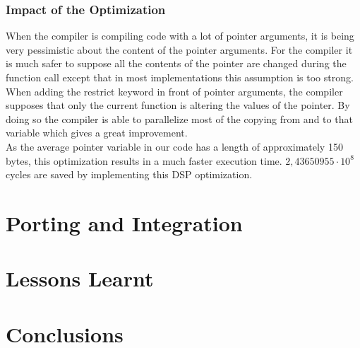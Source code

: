 \documentclass[a4paper]{article}
\begin{document}
	\subsubsection{Impact of the Optimization}
	When the compiler is compiling code with a lot of pointer arguments, it is being very pessimistic about the content of the pointer arguments. For the compiler it is much safer to suppose all the contents of the pointer are changed during the function call except that in most implementations this assumption is too strong. When adding the restrict keyword in front of pointer arguments, the compiler supposes that only the current function is altering the values of the pointer. By doing so the compiler is able to parallelize most of the copying from and to that variable which gives a great improvement.\\
	
	As the average pointer variable in our code has a length of approximately 150 bytes, this optimization results in a much faster execution time. $2,43650955\cdot10^{8}$ cycles are saved by implementing this DSP optimization.
\section{Porting and Integration}

\section{Lessons Learnt}

\section{Conclusions}
\end{document}
